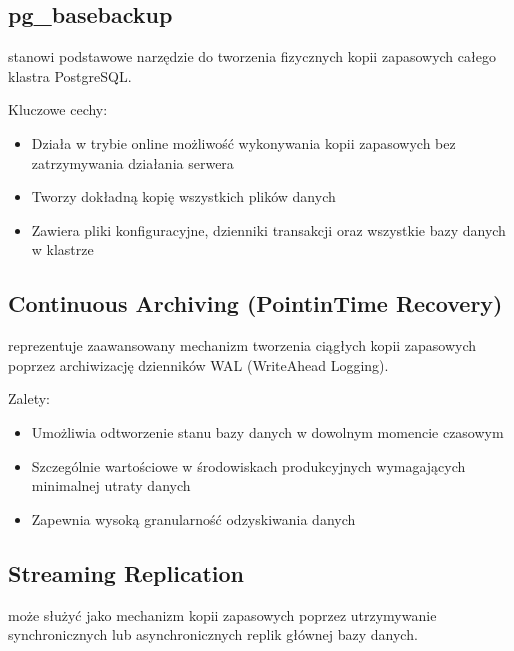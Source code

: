\documentclass[letterpaper,10pt,polish]{sphinxmanual}
\begin{document}
\subsection{pg\_basebackup}
\label{\detokenize{kopie_zapasowe_i_odzyskiwanie_danych:pg-basebackup}}
\sphinxAtStartPar
{} stanowi podstawowe narzędzie do tworzenia fizycznych kopii zapasowych całego klastra PostgreSQL.

\sphinxAtStartPar
Kluczowe cechy:
\begin{itemize}
\item {} 
\sphinxAtStartPar
Działa w trybie online \sphinxhyphen{} możliwość wykonywania kopii zapasowych bez zatrzymywania działania serwera

\item {} 
\sphinxAtStartPar
Tworzy dokładną kopię wszystkich plików danych

\item {} 
\sphinxAtStartPar
Zawiera pliki konfiguracyjne, dzienniki transakcji oraz wszystkie bazy danych w klastrze

\end{itemize}


\subsection{Continuous Archiving (Point\sphinxhyphen{}in\sphinxhyphen{}Time Recovery)}
\label{\detokenize{kopie_zapasowe_i_odzyskiwanie_danych:continuous-archiving-point-in-time-recovery}}
\sphinxAtStartPar
{} reprezentuje zaawansowany mechanizm tworzenia ciągłych kopii zapasowych poprzez archiwizację dzienników WAL (Write\sphinxhyphen{}Ahead Logging).

\sphinxAtStartPar
Zalety:
\begin{itemize}
\item {} 
\sphinxAtStartPar
Umożliwia odtworzenie stanu bazy danych w dowolnym momencie czasowym

\item {} 
\sphinxAtStartPar
Szczególnie wartościowe w środowiskach produkcyjnych wymagających minimalnej utraty danych

\item {} 
\sphinxAtStartPar
Zapewnia wysoką granularność odzyskiwania danych

\end{itemize}


\subsection{Streaming Replication}
\label{\detokenize{kopie_zapasowe_i_odzyskiwanie_danych:streaming-replication}}
\sphinxAtStartPar
{} może służyć jako mechanizm kopii zapasowych poprzez utrzymywanie synchronicznych lub asynchronicznych replik głównej bazy danych.
\end{document}
